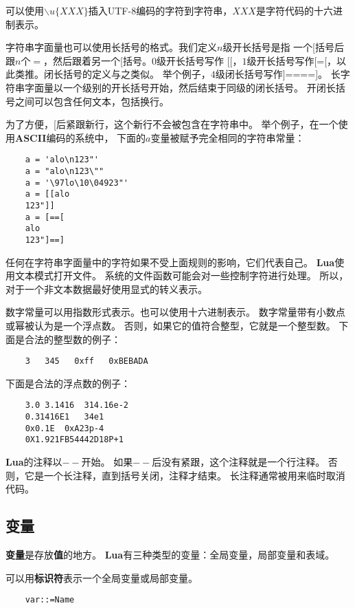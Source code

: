 \documentclass{ctexart}
\begin{document}
可以使用$\backslash u\{XXX\}$插入UTF-8编码的字符到字符串，$XXX$是字符代码的十六进制表示。

字符串字面量也可以使用长括号的格式。我们定义$n$级开长括号是指
一个[括号后跟$n$个$=$，然后跟着另一个[括号。$0$级开长括号写作
[[，$1$级开长括号写作[=[，以此类推。闭长括号的定义与之类似。
举个例子，$4$级闭长括号写作]====]。
长字符串字面量以一个级别的开长括号开始，然后结束于同级的闭长括号。
开闭长括号之间可以包含任何文本，包括换行。

为了方便，[后紧跟新行，这个新行不会被包含在字符串中。
举个例子，在一个使用\textbf{ASCII}编码的系统中，
下面的$a$变量被赋予完全相同的字符串常量：

\lstset{language=C}
\begin{lstlisting}
	a = 'alo\n123"'
	a = "alo\n123\""
	a = '\97lo\10\04923"'
	a = [[alo
	123"]]
	a = [==[
	alo
	123"]==]
\end{lstlisting}

任何在字符串字面量中的字符如果不受上面规则的影响，它们代表自己。
\textbf{Lua}使用文本模式打开文件。
系统的文件函数可能会对一些控制字符进行处理。
所以，对于一个非文本数据最好使用显式的转义表示。

数字常量可以用指数形式表示。也可以使用十六进制表示。
数字常量带有小数点或幂被认为是一个浮点数。
否则，如果它的值符合整型，它就是一个整型数。
下面是合法的整型数的例子：

\lstset{language=C}
\begin{lstlisting}
	3   345   0xff   0xBEBADA
\end{lstlisting}

下面是合法的浮点数的例子：

\lstset{language=C}
\begin{lstlisting}
	3.0	3.1416	314.16e-2
	0.31416E1	34e1
	0x0.1E	0xA23p-4
	0X1.921FB54442D18P+1
\end{lstlisting}

\textbf{Lua}的注释以$--$开始。
如果$--$后没有紧跟，这个注释就是一个行注释。
否则，它是一个长注释，直到括号关闭，注释才结束。
长注释通常被用来临时取消代码。

\subsection{变量}

\textbf{变量}是存放\textbf{值}的地方。
\textbf{Lua}有三种类型的变量：全局变量，局部变量和表域。

可以用\textbf{标识符}表示一个全局变量或局部变量。

\lstset{language=C}
\begin{lstlisting}
	var::=Name
\end{lstlisting}
\end{document}
